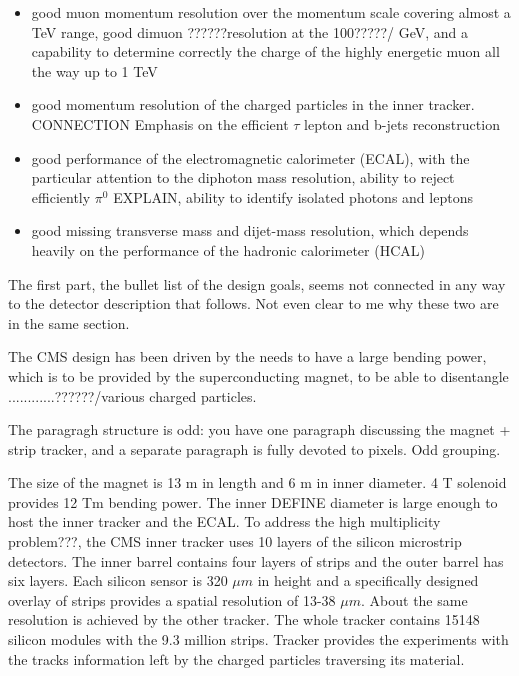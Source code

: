 \begin{itemize}
\item good muon momentum resolution over the momentum scale covering almost a TeV range, good dimuon ??????resolution at the 100?????/ GeV, and a capability to determine correctly the charge of the highly energetic muon all the way up to 1 TeV
\item good momentum resolution of the charged particles in the inner tracker. CONNECTION Emphasis on the efficient $\tau$ lepton and b-jets reconstruction
\item good performance of the electromagnetic calorimeter (ECAL), with the particular attention to the diphoton mass resolution, ability to reject efficiently $\pi^0$ EXPLAIN, ability to identify isolated photons and leptons
\item good missing transverse mass and dijet-mass resolution, which depends heavily on the performance of the hadronic calorimeter (HCAL)
\end{itemize}

The first part, the bullet list of the design goals, seems not connected in any way to the detector description that follows. Not even clear to me why these two are in the same section.


The CMS design has been driven by the needs to have a large bending power, which is to be provided by the superconducting magnet, to be able to disentangle ............??????/various charged particles. 

The paragragh structure is odd: you have one paragraph discussing the magnet + strip tracker, and a separate paragraph is fully devoted to pixels. Odd grouping.






The size of the magnet is 13 m in length and 6 m in inner diameter. 4 T solenoid provides 12 Tm bending power. The inner  DEFINE diameter is large enough to host the inner tracker and the ECAL. To address the high multiplicity problem???, the CMS inner tracker uses 10 layers of the silicon microstrip detectors. The inner barrel contains four layers of strips and the outer barrel has six layers. Each silicon sensor is 320 $\mu m$ in height and a specifically designed overlay of strips provides a spatial resolution of 13-38 $\mu m$. About the same resolution is achieved by the other tracker. The whole tracker contains 15148 silicon modules with the 9.3 million strips. Tracker provides the experiments with the tracks information left by the charged particles traversing its material. 

